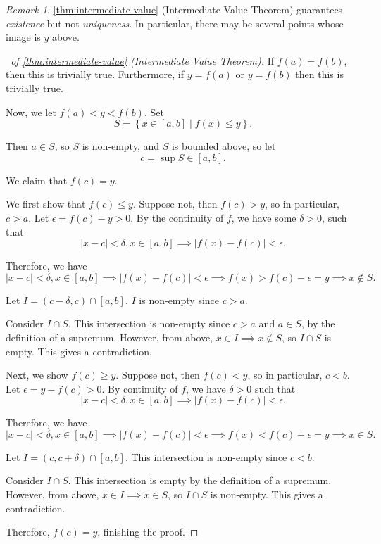 \documentclass[11pt]{article}
\numberwithin{equation}{section}
\theoremstyle{definition}
\theoremstyle{remark}
\newtheorem{remark}[theorem]{Remark}
\newcommand{\pqty}[1]{\left(#1\right)}
\newcommand{\abs}[1]{\left|#1\right|}
\newcommand{\set}[2]{\left\{#1\mid #2\right\}}
\newcommand{\ccintv}[2]{[#1,#2]}
\newcommand{\oointv}[2]{(#1,#2)}
\begin{document}
\begin{remark}\label{analysis-unit-0097}
    \autoref{thm:intermediate-value} (Intermediate Value Theorem) guarantees \emph{existence} but not \emph{uniqueness}. In particular, there may be several points whose image is \(y\) above.
\end{remark}

\begin{proof}[\proofname\ of \autoref{thm:intermediate-value} (Intermediate Value Theorem)]
    If \(f \pqty{a} = f\pqty{b}\), then this is trivially true. Furthermore, if \(y = f\pqty{a}\) or \(y = f\pqty{b}\) then this is trivially true.

    Now, we let \(f\pqty{a} < y < f\pqty{b}\). Set
    \[
        S = \set{x \in \ccintv{a}{b}}{f\pqty{x} \leq y}.
    \]

    Then \(a \in S\), so \(S\) is non-empty, and \(S\) is bounded above, so let
    \[
        c = \sup S \in \ccintv{a}{b}.
    \]

    We claim that \(f\pqty{c} = y\).

    We first show that \(f\pqty{c} \leq y\). Suppose not, then \(f\pqty{c} > y\), so in particular, \(c > a\). Let \(\epsilon = f\pqty{c} - y > 0\). By the continuity of \(f\), we have some \(\delta > 0\), such that
    \[
        \abs{x - c} < \delta, x \in \ccintv{a}{b} \implies \abs{f\pqty{x} - f\pqty{c}} < \epsilon.
    \]

    Therefore, we have
    \[
         \abs{x - c} < \delta, x \in \ccintv{a}{b} \implies \abs{f\pqty{x} - f\pqty{c}} < \epsilon \implies f\pqty{x} > f\pqty{c} - \epsilon = y \implies x \notin S.
    \]

    Let \(I = \oointv{c - \delta}{c} \cap \ccintv{a}{b}\). \(I\) is non-empty since \(c > a\).

    Consider \(I \cap S\). This intersection is non-empty since \(c > a\) and \(a \in S\), by the definition of a supremum. However, from above, \(x \in I \implies x \notin S\), so \(I \cap S\) is empty. This gives a contradiction.

    Next, we show \(f\pqty{c} \geq y\). Suppose not, then \(f\pqty{c} < y\), so in particular, \(c < b\). Let \(\epsilon = y - f\pqty{c} > 0\). By continuity of \(f\), we have \(\delta > 0\) such that
    \[
        \abs{x - c} < \delta, x \in \ccintv{a}{b} \implies \abs{f\pqty{x} - f\pqty{c}} < \epsilon.
    \]

    Therefore, we have
    \[
        \abs{x - c} < \delta, x \in \ccintv{a}{b} \implies \abs{f\pqty{x} - f\pqty{c}} < \epsilon \implies f\pqty{x} < f\pqty{c} + \epsilon = y \implies x \in S.
    \]
    
    Let \(I = \oointv{c}{c + \delta} \cap \ccintv{a}{b}\). This intersection is non-empty since \(c < b\).
    
    Consider \(I \cap S\). This intersection is empty by the definition of a supremum. However, from above, \(x \in I \implies x \in S\), so \(I \cap S\) is non-empty. This gives a contradiction.

    Therefore, \(f\pqty{c} = y\), finishing the proof.
\end{proof}
\end{document}
